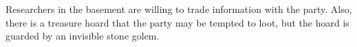 Researchers in the basement are willing to trade information with the party.
Also, there is a treasure hoard that the party may be tempted to loot, but the hoard is guarded by an invisible stone golem.

